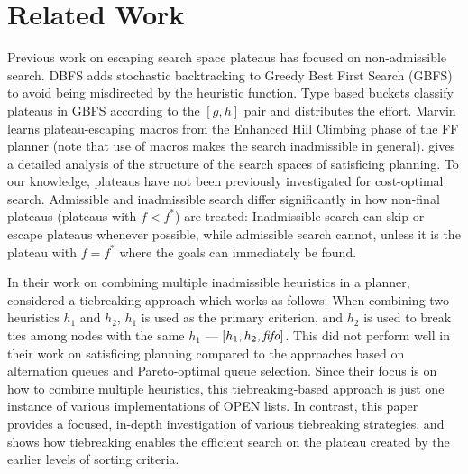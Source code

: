 
\section{Related Work}

Previous work on escaping search space plateaus has focused on
non-admissible search.  DBFS \cite{imai2011novel} %
adds stochastic backtracking to Greedy Best First Search (GBFS) to avoid
being misdirected by the heuristic function. Type based buckets
\cite{xie14type} classify plateaus in GBFS according to the
$[g,h]$ pair and distributes the effort.  Marvin \cite{Coles07} learns plateau-escaping macros
from the Enhanced Hill Climbing phase of the FF planner
\cite{Hoffmann01} (note that use of macros makes the search inadmissible in general).
\citeauthor{Hoffmann05} \citeyear{Hoffmann05,Hoffmann11} gives a detailed analysis of the
structure of the search spaces of satisficing planning.
% 
To our knowledge, plateaus have not been previously investigated for cost-optimal search.
Admissible and inadmissible search differ significantly in how non-final plateaus (plateaus with $f < f^*$) are treated:
Inadmissible search can skip or escape plateaus whenever possible, while
admissible search cannot, unless it is the plateau with $f=f^*$ where the goals can immediately be found.

In their work on combining multiple inadmissible heuristics in a planner,
\citeauthor{RogerH10} \citeyear{RogerH10} considered a tiebreaking approach which works as follows:
When combining two heuristics $h_1$ and $h_2$, $h_1$ is used as the primary criterion,
and $h_2$ is used to break ties among nodes with the same $h_1$ --- $[h_1,h_2,{\text{\textit{fifo}}}]$.
This did not perform well in their work on satisficing planning compared to the approaches based on alternation queues and Pareto-optimal queue selection.
% 
Since their focus is on how to combine multiple heuristics,
this tiebreaking-based approach is just one instance of various implementations of OPEN lists.
In contrast, this paper provides a focused, in-depth investigation of various tiebreaking strategies,
and shows 
how tiebreaking enables the efficient search on the plateau created by the earlier levels of sorting criteria.

